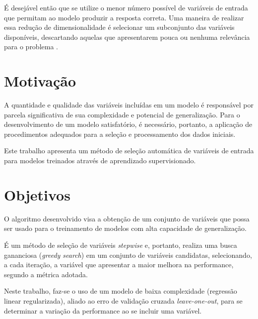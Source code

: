É desejável então que se utilize o menor número possível de variáveis de entrada que permitam ao modelo produzir a resposta correta. Uma maneira de realizar essa redução de dimensionalidade é selecionar um subconjunto das variáveis disponíveis, descartando aquelas que apresentarem pouca ou nenhuma relevância para o problema \cite[p. 204]{intro_stat_learn}.


\section{Motivação}
A quantidade e qualidade das variáveis incluídas em um modelo é responsável por parcela significativa de sua complexidade e potencial de generalização. Para o desenvolvimento de um modelo satisfatório, é necessário, portanto, a aplicação de procedimentos adequados para a seleção e processamento dos dados iniciais.

Este trabalho apresenta um método de seleção automática de variáveis de entrada para modelos treinados através de aprendizado supervisionado.

\section{Objetivos}

 O algoritmo desenvolvido visa a obtenção de um conjunto de variáveis que possa ser usado para o treinamento de modelos com alta capacidade de generalização. 
 
 É um método de seleção de variáveis \textit{stepwise} e, portanto, realiza uma busca gananciosa (\textit{greedy search}) em um conjunto de variáveis candidatas, selecionando, a cada iteração, a variável que apresentar a maior melhora na performance, segundo a métrica adotada.
 
Neste trabalho, faz-se o uso de um modelo de baixa complexidade (regressão linear regularizada), aliado ao erro de validação cruzada \textit{leave-one-out}, para se determinar a variação da performance ao se incluir uma variável.